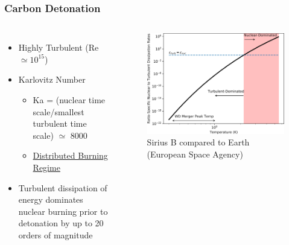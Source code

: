 \documentclass{beamer}
\begin{document}
\begin{frame}
\frametitle{Carbon Detonation}

\begin{columns}[c]
        \begin{itemize}
		\item Highly Turbulent (Re $\simeq 10^{15}$) 
                \item Karlovitz Number
			\begin{itemize}
				\item Ka = (nuclear time scale/smallest turbulent time scale) $\simeq$ 8000
				\item \underline{Distributed Burning Regime}
			\end{itemize}
		\item Turbulent dissipation of energy dominates nuclear burning prior to detonation by up to 20 orders of magnitude
        \end{itemize}


	\vspace{25pt}
        \begin{figure}
    \begin{center}
      \includegraphics[width=.90\linewidth]{carbon_enuc_ration.png}
            \caption{Sirius B compared to Earth (European Space Agency)}
    \end{center}
  \end{figure}

        \end{columns}

\end{frame}



\end{document}

